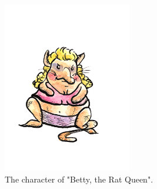 \documentclass[12pt]{IEEEtran}
\begin{document}
	\begin{figure}[h]
		\centering
		\includegraphics[width=0.5\textwidth]{Rat_Betty.jpg}
		\caption{The character of "Betty, the Rat Queen".}
		\label{fig:betty}
	\end{figure}
\end{document}
